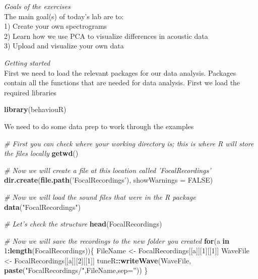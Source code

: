 \documentclass[]{book}
\newenvironment{Shaded}{\begin{snugshade}}{\end{snugshade}}
\newcommand{\CommentTok}[1]{\textcolor[rgb]{0.56,0.35,0.01}{\textit{#1}}}
\newcommand{\ControlFlowTok}[1]{\textcolor[rgb]{0.13,0.29,0.53}{\textbf{#1}}}
\newcommand{\DataTypeTok}[1]{\textcolor[rgb]{0.13,0.29,0.53}{#1}}
\newcommand{\DecValTok}[1]{\textcolor[rgb]{0.00,0.00,0.81}{#1}}
\newcommand{\KeywordTok}[1]{\textcolor[rgb]{0.13,0.29,0.53}{\textbf{#1}}}
\newcommand{\NormalTok}[1]{#1}
\newcommand{\OperatorTok}[1]{\textcolor[rgb]{0.81,0.36,0.00}{\textbf{#1}}}
\newcommand{\OtherTok}[1]{\textcolor[rgb]{0.56,0.35,0.01}{#1}}
\newcommand{\StringTok}[1]{\textcolor[rgb]{0.31,0.60,0.02}{#1}}
\begin{document}
\emph{Goals of the exercises}\\
The main goal(s) of today's lab are to:\\
1) Create your own spectrograms\\
2) Learn how we use PCA to visualize differences in acoustic data\\
3) Upload and visualize your own data

\emph{Getting started}\\
First we need to load the relevant packages for our data analysis. Packages contain all the functions that are needed for data analysis.
First we load the required libraries

\begin{Shaded}
\begin{Highlighting}[]
\KeywordTok{library}\NormalTok{(behaviouR)}
\end{Highlighting}
\end{Shaded}

We need to do some data prep to work through the examples

\begin{Shaded}
\begin{Highlighting}[]
\CommentTok{# First you can check where your working directory is; this is where R will store the files locally}
\KeywordTok{getwd}\NormalTok{()}

\CommentTok{# Now we will create a file at this location called 'FocalRecordings'}
\KeywordTok{dir.create}\NormalTok{(}\KeywordTok{file.path}\NormalTok{(}\StringTok{'FocalRecordings'}\NormalTok{), }\DataTypeTok{showWarnings =} \OtherTok{FALSE}\NormalTok{)}

\CommentTok{# Now we will load the sound files that were in the R package}
\KeywordTok{data}\NormalTok{(}\StringTok{"FocalRecordings"}\NormalTok{)}

\CommentTok{# Let's check the structure}
\KeywordTok{head}\NormalTok{(FocalRecordings)}

\CommentTok{# Now we will save the recordings to the new folder you created}
\ControlFlowTok{for}\NormalTok{(a }\ControlFlowTok{in} \DecValTok{1}\OperatorTok{:}\KeywordTok{length}\NormalTok{(FocalRecordings))\{}
\NormalTok{  FileName <-}\StringTok{ }\NormalTok{FocalRecordings[[a]][}\DecValTok{1}\NormalTok{][[}\DecValTok{1}\NormalTok{]]}
\NormalTok{  WaveFile <-}\StringTok{ }\NormalTok{FocalRecordings[[a]][}\DecValTok{2}\NormalTok{][[}\DecValTok{1}\NormalTok{]]}
\NormalTok{  tuneR}\OperatorTok{::}\KeywordTok{writeWave}\NormalTok{(WaveFile, }\KeywordTok{paste}\NormalTok{(}\StringTok{"FocalRecordings/"}\NormalTok{,FileName,}\DataTypeTok{sep=}\StringTok{''}\NormalTok{))}
\NormalTok{\}}
\end{Highlighting}
\end{Shaded}
\end{document}
